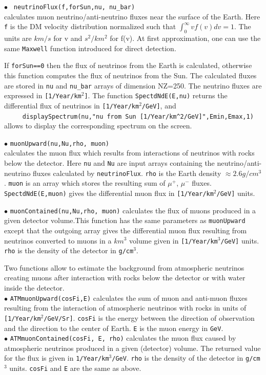 \documentclass[12pt,a4paper]{article}
\begin{document}
\noindent
$\bullet$ \verb| neutrinoFlux(f,forSun,nu, nu_bar)|\\
calculates muon neutrino/anti-neutrino  fluxes  near the surface of the Earth. 
Here  \verb|f|  is  the DM velocity distribution   normalized such that 
$ \int_0^{\infty} v f(v) dv =1$. The units  are $km/s$ for v and $s^2/km^2$ for  
f(v). At first approximation,   one can use the same  \verb|Maxwell| 
function introduced for direct detection.
  
  If {\tt forSun==0} then the flux of neutrinos from the Earth is calculated, otherwise this function computes the flux of neutrinos from the Sun.  The calculated fluxes are stored in {\tt nu} and {\tt nu\_bar}  arrays of dimension NZ=250.  
The neutrino fluxes are expressed in \verb|[1/Year/km|$^2$\verb|]|.
 The function
{\tt SpectdNdE(E,nu)} returns the differential flux of neutrinos in 
\verb|[1/Year/km|$^2$\verb|/GeV]|, and \\
\verb|     displaySpectrum(nu,"nu from Sun [1/Year/km^2/GeV]",Emin,Emax,1)|\\
allows to display the corresponding spectrum on the screen.    




\noindent
$\bullet$ \verb|muonUpward(nu,Nu,rho, muon)|\\
calculates the muon flux which results from interactions of
neutrinos with rocks below the detector. Here  {\tt nu} and {\tt Nu} are input arrays containing the
neutrino/anti-neutrino fluxes calculated by {\tt neutrinoFlux}. 
{\tt rho} is  the Earth density $\approx 2.6g/cm^3$. {\tt muon} is an
array which stores the resulting sum of $\mu^+$, $\mu^-$ fluxes. {\tt SpectdNdE(E,muon)}  gives the
differential muon flux  in \verb|[1/Year/km|$^2$\verb|/GeV]| units.  
 

\noindent $\bullet$ \verb|muonContained(nu,Nu,rho, muon)|
calculates  the flux  of muons  produced in a given detector volume.This function  has the same parameters as \verb|muonUpward| 
except that the  outgoing  array gives the differential muon flux resulting from neutrinos converted to muons 
in a  $km^3$ volume given  in \verb|[1/Year/km|$^3$\verb|/GeV]| units.  \verb|rho| is the density of the detector in 
\verb|g/cm|$^3$.


Two functions allow to estimate the background from atmospheric neutrinos creating muons after interaction  with rocks below the detector  or with water inside the detector.\\
\noindent $\bullet$  \verb|ATMmuonUpward(cosFi,E)| calculates the sum of  muon
and anti-muon fluxes resulting from the
interaction of  atmospheric  neutrinos with rocks in units of  
\verb|[1/Year/km|$^2$\verb|/GeV/Sr]|. \verb|cosFi|  is the energy between the direction of
observation and the direction to the center of Earth. \verb|E|  is the  muon energy in
{\tt GeV}.\\
\noindent $\bullet$  \verb|ATMmuonContained(cosFi, E, rho)| calculates the muon flux
caused by atmospheric  neutrinos  produced in a given (detector)
volume. The returned value for the flux is given in  \verb|1/Year/km|$^3$\verb|/GeV|. {\tt rho} is
the density of the detector in \verb|g/cm|$^3$ units. {\tt cosFi} and {\tt E} are the
same as above. 
\end{document}
